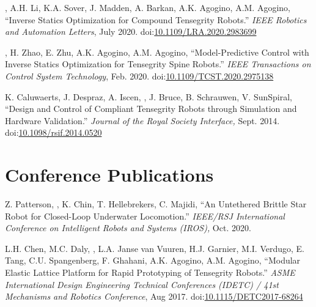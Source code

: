 \documentclass[letterpaper]{deedy-resume} %
\newcommand\doilink[1]{\href{http://dx.doi.org/#1}{#1}}
\newcommand\doi[1]{doi:\doilink{#1}}
\begin{document}
{%
\begin{etaremune}[itemsep=0.1cm]

\item \underline{{}}, A.H. Li, K.A. Sover, J. Madden, A. Barkan, A.K. Agogino, A.M. Agogino, ``Inverse Statics Optimization for Compound Tensegrity Robots.'' {\it IEEE Robotics and Automation Letters}, July 2020. \doi{10.1109/LRA.2020.2983699}

\item \underline{{}}, H. Zhao, E. Zhu, A.K. Agogino, A.M. Agogino, ``Model-Predictive Control with Inverse Statics Optimization for Tensegrity Spine Robots.'' {\it IEEE Transactions on Control System Technology}, Feb. 2020. \doi{10.1109/TCST.2020.2975138}

\item K. Caluwaerts, J. Despraz, A. Iscen, \underline{{}}, J. Bruce, B. Schrauwen, V. SunSpiral, ``Design and Control of Compliant Tensegrity Robots through Simulation and Hardware Validation.'' {\it Journal of the Royal Society Interface,} Sept. 2014. \doi{10.1098/rsif.2014.0520}

\end{etaremune}


\section{Conference Publications}
\vspace{0.2cm}

\begin{etaremune}[itemsep=0.1cm]

\item Z. Patterson, \underline{{}}, K. Chin, T. Hellebrekers, C. Majidi, ``An Untethered Brittle Star Robot for Closed-Loop Underwater Locomotion.'' {\it IEEE/RSJ International Conference on Intelligent Robots and Systems (IROS),} Oct. 2020.

\item L.H. Chen, M.C. Daly, \underline{{}}, L.A. Janse van Vuuren, H.J. Garnier, M.I. Verdugo, E. Tang, C.U. Spangenberg, F. Ghahani, A.K. Agogino, A.M. Agogino, ``Modular Elastic Lattice Platform for Rapid Prototyping of Tensegrity Robots.'' {\it  ASME International Design Engineering Technical Conferences (IDETC) / 41st Mechanisms and Robotics Conference}, Aug 2017. \doi{10.1115/DETC2017-68264}


\end{etaremune}}
\end{document}
